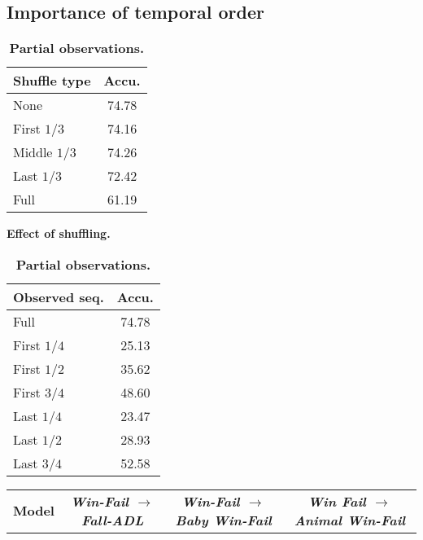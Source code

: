 \documentclass[final]{cvpr}
\begin{document}
\subsection{Importance of temporal order}
\label{sec:exp_scrambling}
\begin{table}[]
\small
    \begin{minipage}{.4\linewidth}
      \centering
\begin{tabular}{@{}lc@{}}
\toprule
\textbf{Shuffle type} & \textbf{Accu.} \\ \midrule
None                     & 74.78             \\
First $1/3$               & 74.16             \\
Middle $1/3$              & 74.26             \\
Last $1/3$                & 72.42             \\
Full                     & 61.19             \\ \bottomrule
\end{tabular}
\caption{\textbf{Effect of shuffling.}}
\label{tab:scrambling}
    \end{minipage}\hfill
\begin{minipage}{.5\linewidth}
    \centering
\begin{tabular}{@{}lc@{}}
\toprule
\textbf{Observed seq.} & \textbf{Accu.} \\ \midrule
Full                         & 74.78             \\ \midrule
First $1/4$                      & 25.13             \\
First $1/2$                      & 35.62             \\
First $3/4$                      & 48.60             \\ \midrule
Last $1/4$                       & 23.47             \\
Last $1/2$                       & 28.93             \\
Last $3/4$                       & 52.58             \\ \bottomrule
\end{tabular}
\caption{\textbf{Partial observations.}}
\label{tab:incomplete_seq}
    \end{minipage} 
\end{table} \begin{table*}[]
\small
\centering
\begin{tabular}{lllcllcllc}
\toprule
\multirow{2}{*}{\textbf{Model}} & \multicolumn{3}{c}{\textit{\textbf{Win-Fail $\rightarrow$ Fall-ADL}}}                 & \multicolumn{3}{c}{\textit{\textbf{Win-Fail $\rightarrow$ Baby Win-Fail}}}   & \multicolumn{3}{c}{\textit{\textbf{Win Fail $\rightarrow$ Animal Win-Fail}}}          \\ \cmidrule(l){2-4} \cmidrule(l){5-7} \cmidrule(l){8-10}

\end{tabular}
\end{table*}
\end{document}
